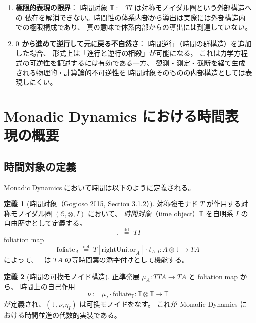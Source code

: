 \documentclass[11pt,a4paper]{ltjsarticle}
\theoremstyle{definition}
\newtheorem{definition}{定義}[section]
\begin{document}
\begin{enumerate}
\item \textbf{極限的表現の限界}：
  時間対象 $\mathbb{T} := TI$ は対称モノイダル圏という外部構造への
  依存を解消できない。時間性の体系内部から導出は実際には外部構造内での極限構成であり、
  真の意味で体系内部からの導出には到達していない。

\item \textbf{$0$ から進めて逆行して元に戻る不自然さ}：
  時間逆行（時間の群構造）を追加した場合、
  形式上は「進行と逆行の相殺」が可能になる。
  これは力学方程式の可逆性を記述するには有効である一方、
  観測・測定・截断を経て生成される物理的・計算論的不可逆性を
  時間対象そのものの内部構造としては表現しにくい。
\end{enumerate}

\section{Monadic Dynamics における時間表現の概要}

\subsection{時間対象の定義}

Monadic Dynamics において時間は以下のように定義される。

\begin{definition}[時間対象（Gogioso 2015, Section 3.1.2）]
対称強モナド $T$ が作用する対称モノイダル圏 $(\mathcal{C}, \otimes, I)$ において、
\emph{時間対象}（time object）$\mathbb{T}$ を自明系 $I$ の自由歴史として定義する。
\[
\mathbb{T} \;\overset{\mathrm{def}}{=}\; T I
\]
foliation map
\[
\mathrm{foliate}_A \;\overset{\mathrm{def}}{=}\;
T[\mathrm{rightUnitor}_A] \cdot t_{A,I} : A \otimes \mathbb{T} \longrightarrow TA
\]
によって、$\mathbb{T}$ は $TA$ の等時間葉の添字付けとして機能する。
\end{definition}

\begin{definition}[時間の可換モノイド構造]
正準発展 $\mu_A: TTA \to TA$ と foliation map から、
時間上の自己作用
\[
\nu := \mu_I \cdot \mathrm{foliate}_{\mathbb{T}} : \mathbb{T} \otimes \mathbb{T} \longrightarrow \mathbb{T}
\]
が定義され、$(\mathbb{T}, \nu, \eta_I)$ は可換モノイドをなす。
これが Monadic Dynamics における時間並進の代数的実装である。
\end{definition}
\end{document}
